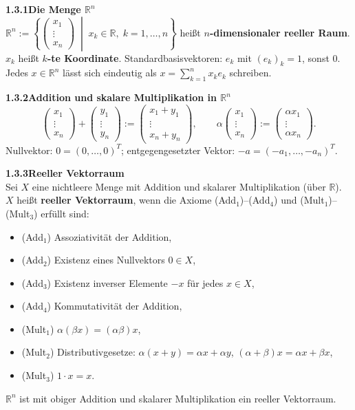 \documentclass[a4paper,12pt]{article}
\newcommand{\gentry}[3]{%
  \noindent\textbf{#1\quad #2}\nopagebreak\\[0.2em]
  #3\par\smallskip
}
\begin{document}
\gentry{1.3.1}{Die Menge $\mathbb{R}^n$}{%
  $\mathbb{R}^n := \left\{ \begin{pmatrix}x_1\\\vdots\\x_n\end{pmatrix} \;\middle|\; x_k \in \mathbb{R},\; k=1,\ldots,n \right\}$
  heißt \textbf{$n$-dimensionaler reeller Raum}. $x_k$ heißt \textbf{$k$-te Koordinate}.
  Standardbasisvektoren: $e_k$ mit $(e_k)_k = 1$, sonst $0$. Jedes $x \in \mathbb{R}^n$ lässt
  sich eindeutig als $x = \sum_{k=1}^n x_k e_k$ schreiben.
}

\gentry{1.3.2}{Addition und skalare Multiplikation in $\mathbb{R}^n$}{%
  \[
    \begin{pmatrix}x_1\\\vdots\\x_n\end{pmatrix} + \begin{pmatrix}y_1\\\vdots\\y_n\end{pmatrix}
    := \begin{pmatrix}x_1+y_1\\\vdots\\x_n+y_n\end{pmatrix}, \qquad
    \alpha \begin{pmatrix}x_1\\\vdots\\x_n\end{pmatrix} := \begin{pmatrix}\alpha x_1\\\vdots\\\alpha x_n\end{pmatrix}.
  \]
  Nullvektor: $0 = (0,\ldots,0)^T$; entgegengesetzter Vektor: $-a = (-a_1,\ldots,-a_n)^T$.
}

\gentry{1.3.3}{Reeller Vektorraum}{%
  Sei $X$ eine nichtleere Menge mit Addition und skalarer Multiplikation (über $\mathbb{R}$).
  $X$ heißt \textbf{reeller Vektorraum}, wenn die Axiome (Add$_{1}$)--(Add$_{4}$) und
  (Mult$_{1}$)--(Mult$_{3}$) erfüllt sind:
  \begin{itemize}[topsep=2pt,itemsep=1pt]
    \item (Add$_1$) Assoziativität der Addition,
    \item (Add$_2$) Existenz eines Nullvektors $0 \in X$,
    \item (Add$_3$) Existenz inverser Elemente $-x$ für jedes $x \in X$,
    \item (Add$_4$) Kommutativität der Addition,
    \item (Mult$_1$) $\alpha(\beta x) = (\alpha\beta)x$,
    \item (Mult$_2$) Distributivgesetze: $\alpha(x+y) = \alpha x + \alpha y$, $(\alpha+\beta)x = \alpha x + \beta x$,
    \item (Mult$_3$) $1 \cdot x = x$.
  \end{itemize}
  $\mathbb{R}^n$ ist mit obiger Addition und skalarer Multiplikation ein reeller Vektorraum.
}
\end{document}
